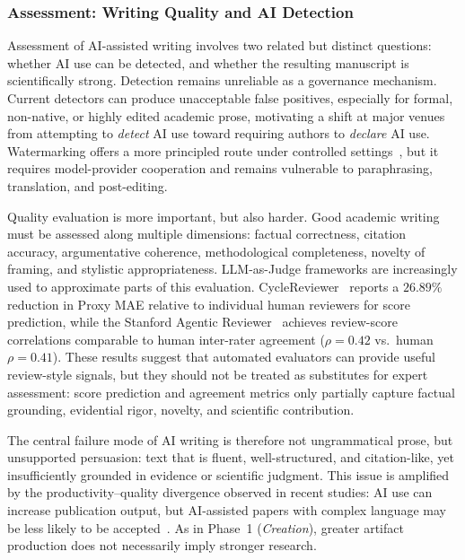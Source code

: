 \documentclass{llmxive}
\begin{document}
\subsubsection{Assessment: Writing Quality and AI Detection}
\label{sec:writing_detection_eval}

Assessment of AI-assisted writing involves two related but distinct questions: whether AI use can be detected, and whether the resulting manuscript is scientifically strong. Detection remains unreliable as a governance mechanism. Current detectors can produce unacceptable false positives, especially for formal, non-native, or highly edited academic prose, motivating a shift at major venues from attempting to \emph{detect} AI use toward requiring authors to \emph{declare} AI use. Watermarking offers a more principled route under controlled settings~\cite{watermarking2025}, but it requires model-provider cooperation and remains vulnerable to paraphrasing, translation, and post-editing.

Quality evaluation is more important, but also harder. Good academic writing must be assessed along multiple dimensions: factual correctness, citation accuracy, argumentative coherence, methodological completeness, novelty of framing, and stylistic appropriateness. LLM-as-Judge frameworks are increasingly used to approximate parts of this evaluation. CycleReviewer~\cite{cycleresearcher2024} reports a $26.89\%$ reduction in Proxy MAE relative to individual human reviewers for score prediction, while the Stanford Agentic Reviewer~\cite{stanfordreviewer2025} achieves review-score correlations comparable to human inter-rater agreement ($\rho=0.42$ vs.\ human $\rho=0.41$). These results suggest that automated evaluators can provide useful review-style signals, but they should not be treated as substitutes for expert assessment: score prediction and agreement metrics only partially capture factual grounding, evidential rigor, novelty, and scientific contribution.

The central failure mode of AI writing is therefore not ungrammatical prose, but unsupported persuasion: text that is fluent, well-structured, and citation-like, yet insufficiently grounded in evidence or scientific judgment. This issue is amplified by the productivity--quality divergence observed in recent studies: AI use can increase publication output, but AI-assisted papers with complex language may be less likely to be accepted~\cite{cornell2025science}. As in Phase~1 (\emph{Creation}), greater artifact production does not necessarily imply stronger research.
\end{document}
